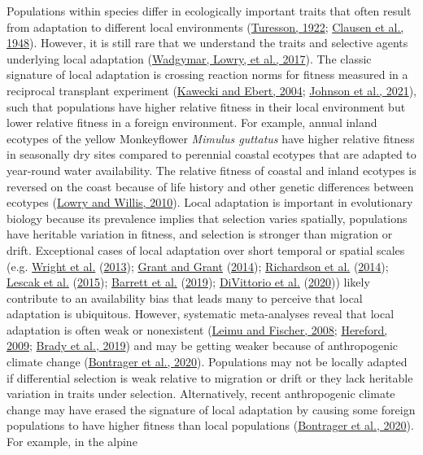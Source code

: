 \documentclass[
  12pt,
]{article}
\begin{document}
Populations within species differ in ecologically important traits that often result from adaptation to different local environments (\protect\hyperlink{ref-turesson_genotypic_1922}{Turesson, 1922}; \protect\hyperlink{ref-clausen_experimental_1948}{Clausen et al., 1948}). However, it is still rare that we understand the traits and selective agents underlying local adaptation (\protect\hyperlink{ref-wadgymar_identifying_2017}{Wadgymar, Lowry, et al., 2017}). The classic signature of local adaptation is crossing reaction norms for fitness measured in a reciprocal transplant experiment (\protect\hyperlink{ref-kawecki_conceptual_2004}{Kawecki and Ebert, 2004}; \protect\hyperlink{ref-johnson_reciprocal_2021}{Johnson et al., 2021}), such that populations have higher relative fitness in their local environment but lower relative fitness in a foreign environment. For example, annual inland ecotypes of the yellow Monkeyflower \emph{Mimulus guttatus} have higher relative fitness in seasonally dry sites compared to perennial coastal ecotypes that are adapted to year-round water availability. The relative fitness of coastal and inland ecotypes is reversed on the coast because of life history and other genetic differences between ecotypes (\protect\hyperlink{ref-lowry_widespread_2010}{Lowry and Willis, 2010}). Local adaptation is important in evolutionary biology because its prevalence implies that selection varies spatially, populations have heritable variation in fitness, and selection is stronger than migration or drift. Exceptional cases of local adaptation over short temporal or spatial scales (e.g. \protect\hyperlink{ref-wright_indirect_2013}{Wright et al.} (\protect\hyperlink{ref-wright_indirect_2013}{2013}); \protect\hyperlink{ref-grant_40_2014}{Grant and Grant} (\protect\hyperlink{ref-grant_40_2014}{2014}); \protect\hyperlink{ref-richardson_microgeographic_2014}{Richardson et al.} (\protect\hyperlink{ref-richardson_microgeographic_2014}{2014}); \protect\hyperlink{ref-lescak_evolution_2015}{Lescak et al.} (\protect\hyperlink{ref-lescak_evolution_2015}{2015}); \protect\hyperlink{ref-barrett_linking_2019}{Barrett et al.} (\protect\hyperlink{ref-barrett_linking_2019}{2019}); \protect\hyperlink{ref-divittorio_natural_2020}{DiVittorio et al.} (\protect\hyperlink{ref-divittorio_natural_2020}{2020})) likely contribute to an availability bias that leads many to perceive that local adaptation is ubiquitous. However, systematic meta-analyses reveal that local adaptation is often weak or nonexistent (\protect\hyperlink{ref-leimu_meta-analysis_2008}{Leimu and Fischer, 2008}; \protect\hyperlink{ref-hereford_quantitative_2009}{Hereford, 2009}; \protect\hyperlink{ref-brady_understanding_2019}{Brady et al., 2019}) and may be getting weaker because of anthropogenic climate change (\protect\hyperlink{ref-bontrager_climate_2020}{Bontrager et al., 2020}). Populations may not be locally adapted if differential selection is weak relative to migration or drift or they lack heritable variation in traits under selection. Alternatively, recent anthropogenic climate change may have erased the signature of local adaptation by causing some foreign populations to have higher fitness than local populations (\protect\hyperlink{ref-bontrager_climate_2020}{Bontrager et al., 2020}). For example, in the alpine 
\end{document}
